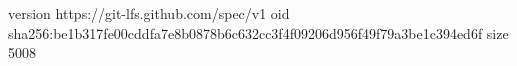 version https://git-lfs.github.com/spec/v1
oid sha256:be1b317fe00cddfa7e8b0878b6c632cc3f4f09206d956f49f79a3be1c394ed6f
size 5008
